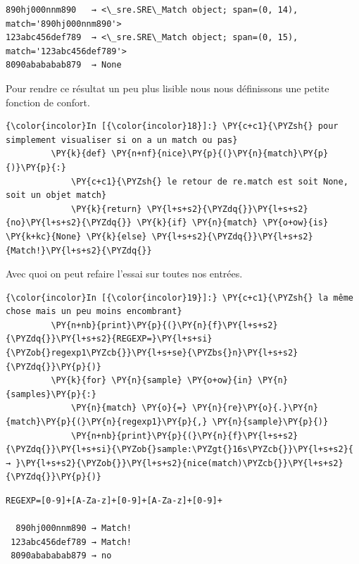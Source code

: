     \begin{Verbatim}[commandchars=\\\{\}]
890hj000nnm890   → <\_sre.SRE\_Match object; span=(0, 14), match='890hj000nnm890'>
123abc456def789  → <\_sre.SRE\_Match object; span=(0, 15), match='123abc456def789'>
8090abababab879  → None

    \end{Verbatim}

    Pour rendre ce résultat un peu plus lisible nous nous définissons une
petite fonction de confort.

    \begin{Verbatim}[commandchars=\\\{\}]
{\color{incolor}In [{\color{incolor}18}]:} \PY{c+c1}{\PYZsh{} pour simplement visualiser si on a un match ou pas}
         \PY{k}{def} \PY{n+nf}{nice}\PY{p}{(}\PY{n}{match}\PY{p}{)}\PY{p}{:}
             \PY{c+c1}{\PYZsh{} le retour de re.match est soit None, soit un objet match}
             \PY{k}{return} \PY{l+s+s2}{\PYZdq{}}\PY{l+s+s2}{no}\PY{l+s+s2}{\PYZdq{}} \PY{k}{if} \PY{n}{match} \PY{o+ow}{is} \PY{k+kc}{None} \PY{k}{else} \PY{l+s+s2}{\PYZdq{}}\PY{l+s+s2}{Match!}\PY{l+s+s2}{\PYZdq{}}
\end{Verbatim}


    Avec quoi on peut refaire l'essai sur toutes nos entrées.

    \begin{Verbatim}[commandchars=\\\{\}]
{\color{incolor}In [{\color{incolor}19}]:} \PY{c+c1}{\PYZsh{} la même chose mais un peu moins encombrant}
         \PY{n+nb}{print}\PY{p}{(}\PY{n}{f}\PY{l+s+s2}{\PYZdq{}}\PY{l+s+s2}{REGEXP=}\PY{l+s+si}{\PYZob{}regexp1\PYZcb{}}\PY{l+s+se}{\PYZbs{}n}\PY{l+s+s2}{\PYZdq{}}\PY{p}{)}
         \PY{k}{for} \PY{n}{sample} \PY{o+ow}{in} \PY{n}{samples}\PY{p}{:}
             \PY{n}{match} \PY{o}{=} \PY{n}{re}\PY{o}{.}\PY{n}{match}\PY{p}{(}\PY{n}{regexp1}\PY{p}{,} \PY{n}{sample}\PY{p}{)}
             \PY{n+nb}{print}\PY{p}{(}\PY{n}{f}\PY{l+s+s2}{\PYZdq{}}\PY{l+s+si}{\PYZob{}sample:\PYZgt{}16s\PYZcb{}}\PY{l+s+s2}{ → }\PY{l+s+s2}{\PYZob{}}\PY{l+s+s2}{nice(match)\PYZcb{}}\PY{l+s+s2}{\PYZdq{}}\PY{p}{)}
\end{Verbatim}


    \begin{Verbatim}[commandchars=\\\{\}]
REGEXP=[0-9]+[A-Za-z]+[0-9]+[A-Za-z]+[0-9]+

  890hj000nnm890 → Match!
 123abc456def789 → Match!
 8090abababab879 → no

    \end{Verbatim}

